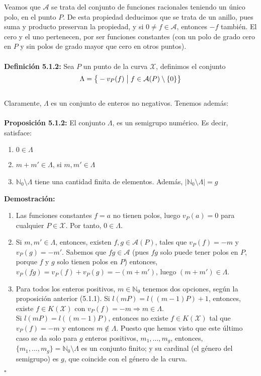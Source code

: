 \documentclass[11pt,spanish]{book}
\newcommand{\qed}{\begin{flushright} $\square$ \end{flushright}}
\begin{document}
Veamos que $\mathcal{A}$ se trata del conjunto de funciones racionales teniendo un único polo, en el punto $P$. De esta propiedad deducimos que se trata de un anillo, pues suma y producto preservan la propiedad, y si $0\neq f\in\mathcal{A}$, entonces $-f$ también. El cero y el uno pertenecen, por ser funciones constantes (con un polo de grado cero en $P$ y sin polos de grado mayor que cero en otros puntos).\\
\\ \textbf{Definición 5.1.2: } Sea $P$ un punto de la curva $\mathbf{\mathcal{X}}$, definimos el conjunto
$$\Lambda = \big{\{} -v_P(f)\;\big{|}\;f\in\mathcal{A}(P)\setminus \{0\}\big{\}} $$
\\ Claramente, $\Lambda$ es un conjunto de enteros no negativos. Tenemos además:\\
\\ \textbf{Proposición 5.1.2:} El conjunto $\Lambda$, es un semigrupo numérico. Es decir, satisface:
\begin{enumerate}
    \item $0\in \Lambda$
    \item $m+m'\in\Lambda$, si $m,m'\in\Lambda$
    \item $\mathbb{N}_0\setminus \Lambda $ tiene una cantidad finita de elementos. Además, $|\mathbb{N}_0\setminus \Lambda| = g$ 
\end{enumerate}
\textbf{Demostración:}
\begin{enumerate}
    \item Las funciones constantes $f=a$ no tienen polos, luego $v_{P}(a)=0$ para cualquier $P\in\mathbf{\mathcal{X}}$. Por tanto, $0\in \Lambda$.
    \item Si $m,m'\in \Lambda$, entonces, existen $f,g\in \mathcal{A}(P)$, tales que $v_P(f)=-m$ y $v_P(g)=-m'$. Sabemos que $fg\in\mathcal{A}$ (pues $fg$ solo puede tener polos en $P$, porque $f$ y $g$ solo tienen polos en $P$) entonces, $v_P(fg)=v_P(f)+v_P(g)=-(m+m')$, luego $(m+m')\in \Lambda$.
    \item Para todos los enteros positivos, $m\in\mathbb{N}_0$ tenemos dos opciones, según la proposición anterior (5.1.1). Si $l(mP)=l((m-1)P)+1$, entonces, existe $f\in K(\mathbf{\mathcal{X}})$ con $v_{P}(f)=-m\Rightarrow m\in\Lambda$. \\
    Si $l(mP)=l((m-1)P)$, entonces no existe $f\in K(\mathbf{\mathcal{X}})$ tal que $v_P(f)=-m$ y entonces $m\notin \Lambda$. Puesto que hemos visto que este último caso se da solo para $g$ enteros positivos, $m_{1},\ldots,m_{g}$, entonces, $\{m_{1},\ldots,m_{g}\}=\mathbb{N}_0\setminus \Lambda$ es un conjunto finito; y su cardinal (el género del semigrupo) es $g$, que coincide con el género de la curva.
\end{enumerate}
\qed
\end{document}

